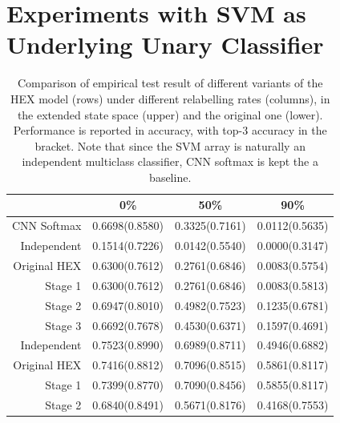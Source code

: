 \documentclass[11pt,a4paper]{article}
\begin{document}
\section{Experiments with SVM as Underlying Unary Classifier}
\label{sec:svm}

\begin{table}[htbp]
\centering
\begin{tabular}{r|c|c|c}
 & 0\% & 50\% & 90\%\\
\hline
CNN Softmax  & 0.6698(0.8580) & 0.3325(0.7161) & 0.0112(0.5635)\\
Independent  & 0.1514(0.7226) & 0.0142(0.5540) & 0.0000(0.3147)\\
Original HEX & 0.6300(0.7612) & 0.2761(0.6846) & 0.0083(0.5754)\\
Stage 1      & 0.6300(0.7612) & 0.2761(0.6846) & 0.0083(0.5813)\\
Stage 2      & 0.6947(0.8010) & 0.4982(0.7523) & 0.1235(0.6781)\\
Stage 3      & 0.6692(0.7678) & 0.4530(0.6371) & 0.1597(0.4691)\\
\hline
Independent  & 0.7523(0.8990) & 0.6989(0.8711) & 0.4946(0.6882)\\
Original HEX & 0.7416(0.8812) & 0.7096(0.8515) & 0.5861(0.8117)\\
Stage 1      & 0.7399(0.8770) & 0.7090(0.8456) & 0.5855(0.8117)\\
Stage 2      & 0.6840(0.8491) & 0.5671(0.8176) & 0.4168(0.7553)
\end{tabular}
\caption{Comparison of empirical test result of different variants of the 	HEX model (rows) under different relabelling rates (columns), in the extended state space (upper) and the original one (lower). Performance is reported in accuracy, with top-3 accuracy in the bracket. Note that since the SVM array is naturally an independent multiclass classifier, CNN softmax is kept the a baseline.}
\label{tab:svmacc}
\end{table}
\end{document}
